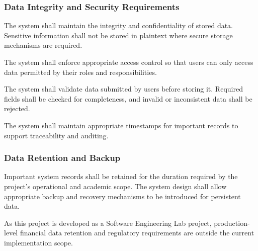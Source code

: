 \subsubsection{Data Integrity and Security Requirements}

The system shall maintain the integrity and confidentiality of stored
data. Sensitive information shall not be stored in plaintext where
secure storage mechanisms are required.

The system shall enforce appropriate access control so that users can
only access data permitted by their roles and responsibilities.

The system shall validate data submitted by users before storing it.
Required fields shall be checked for completeness, and invalid or
inconsistent data shall be rejected.

The system shall maintain appropriate timestamps for important records
to support traceability and auditing.

\subsubsection{Data Retention and Backup}

Important system records shall be retained for the duration required by
the project's operational and academic scope. The system design shall
allow appropriate backup and recovery mechanisms to be introduced for
persistent data.

As this project is developed as a Software Engineering Lab project,
production-level financial data retention and regulatory requirements are
outside the current implementation scope.